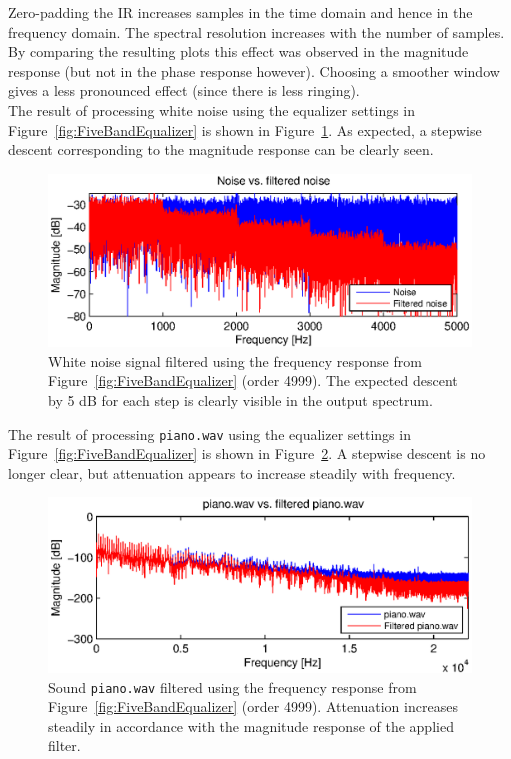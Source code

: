 \noindent Zero-padding the IR increases samples in the time domain and hence in the frequency domain. The spectral resolution increases with the number of samples. By comparing the resulting plots this effect was observed in the magnitude response (but not in the phase response however). Choosing a smoother window gives a less pronounced effect (since there is less ringing). \\

\noindent The result of processing white noise using the equalizer settings in Figure~\ref{fig:FiveBandEqualizer} is shown in Figure~\ref{fig:EqualizedNoise}. As expected, a stepwise descent corresponding to the magnitude response can be clearly seen.
\begin{figure}[H]
\center
\includegraphics[scale=1]{./picture/EqualizedNoise.eps}%
\caption{White noise signal filtered using the frequency response from Figure~\ref{fig:FiveBandEqualizer} (order 4999). The expected descent by 5 dB for each step is clearly visible in the output spectrum.}
\label{fig:EqualizedNoise}
\end{figure}

\noindent The result of processing \texttt{piano.wav} using the equalizer settings in Figure~\ref{fig:FiveBandEqualizer} is shown in Figure~\ref{fig:EqualizedPiano}. A stepwise descent is no longer clear, but attenuation appears to increase steadily with frequency.
\begin{figure}[H]
\center
\includegraphics[scale=1]{./picture/EqualizedPiano.eps}%
\caption{Sound \texttt{piano.wav} filtered using the frequency response from Figure~\ref{fig:FiveBandEqualizer} (order 4999). Attenuation increases steadily in accordance with the magnitude response of the applied filter.}
\label{fig:EqualizedPiano}
\end{figure}
